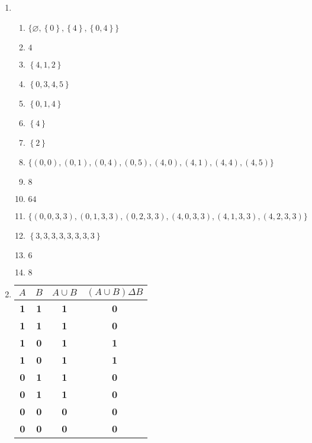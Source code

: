 \begin{enumerate}[leftmargin=2cm,labelsep=.5cm,label=\bf\arabic*.]
\item
\begin{enumerate}
  \item $\big\{\varnothing,\left\{0\right\},\left\{4\right\},\left\{0,4\right\} \big\}$
  \item $4$
  \item $\left\{4,1,2 \right\}$
  \item $\left\{0,3,4,5 \right\}$
  \item $\left\{0,1,4 \right\}$
  \item $\left\{4 \right\}$
  \item $\left\{2 \right\}$
  \item $\big\{\left(0,0\right),\left(0,1\right),\left(0,4\right),\left(0,5\right),\left(4,0\right),\left(4,1\right),\left(4,4\right),\left(4,5\right) \big\}$
  \item $8$
  \item $64$
  \item $\big\{\left(0,0,3,3\right),\left(0,1,3,3\right),\left(0,2,3,3\right),\left(4,0,3,3\right),\left(4,1,3,3\right),\left(4,2,3,3\right) \big\}$
  \item $\left\{3,3,3,3,3,3,3,3 \right\}$
  \item $6$
  \item $8$\\[5mm]
\end{enumerate}

\item
\begin{tabu}[t]{|c|c|c|c|}
\hline
$A$ & $B$ & $A\cup B$ & $(A\cup B)\Delta B$ \\ \hline
\textbf{1} & \textbf{1} & \textbf{1} & \textbf{0} \\ \hline
\textbf{1} & \textbf{1} & \textbf{1} & \textbf{0} \\ \hline
\textbf{1} & \textbf{0} & \textbf{1} & \textbf{1} \\ \hline
\textbf{1} & \textbf{0} & \textbf{1} & \textbf{1} \\ \hline
\textbf{0} & \textbf{1} & \textbf{1} & \textbf{0} \\ \hline
\textbf{0} & \textbf{1} & \textbf{1} & \textbf{0} \\ \hline
\textbf{0} & \textbf{0} & \textbf{0} & \textbf{0} \\ \hline
\textbf{0} & \textbf{0} & \textbf{0} & \textbf{0} \\ \hline
\end{tabu}\\[5mm]


\end{enumerate}
